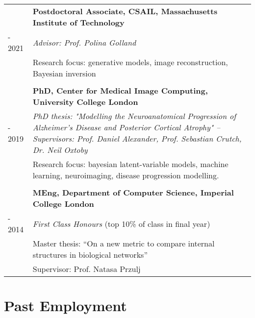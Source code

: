 \documentclass[a4paper,10pt]{article} %
\begin{document}
\begin{tabular}{>{\raggedleft\arraybackslash} p{0.93cm}|p{15.7cm}}
2019 & \large\textbf{Postdoctoral Associate, CSAIL, Massachusetts Institute of Technology} \\
- 2021 & \emph{Advisor: Prof. Polina Golland}\\
& Research focus: generative models, image reconstruction, Bayesian inversion\\

&\\

2014 & \large\textbf{PhD, Center for Medical Image Computing, University College London}\\
- 2019 & \emph{PhD thesis: "Modelling the Neuroanatomical Progression of
Alzheimer’s Disease and Posterior Cortical Atrophy" -- \small Supervisors: Prof. Daniel Alexander, Prof. Sebastian Crutch, Dr. Neil Oxtoby}\\

& Research focus: bayesian latent-variable models, machine learning, neuroimaging, disease progression modelling.\\

\\
2010 & \large\textbf{MEng, Department of  Computer Science, Imperial College London}\\
- 2014 & \emph{First Class Honours} (top 10\% of class in final year) \\
& Master thesis: ``On a new metric to compare internal structures in biological
networks''\\
& \small Supervisor: Prof. Natasa Przulj\\
\end{tabular}



\section*{Past Employment}
\end{document}
